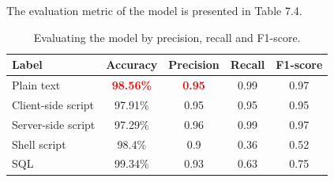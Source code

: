 The evaluation metric of the model is presented in Table 7.4.

\begin{table}[h!]
\centering
	\begin{tabular}{lcccc}
	\hline
	\textbf{Label}     & \textbf{Accuracy} & \textbf{Precision} & \textbf{Recall} & \textbf{F1-score} \\ \hline
	Plain text         & \textcolor{red}{\textbf{98.56\%}}  & \textcolor{red}{\textbf{0.95}}      & 0.99            & 0.97              \\
	Client-side script & 97.91\%           & 0.95               & 0.95            & 0.95              \\
	Server-side script & 97.29\%           & 0.96               & 0.99            & 0.97              \\
	Shell script       & 98.4\%            & 0.9                & 0.36            & 0.52              \\
	SQL                & 99.34\%           & 0.93               & 0.63            & 0.75              \\ \hline
	\end{tabular}
	\caption{\label{demo-table} Evaluating the model by precision, recall and F1-score.}
	\end{table}

